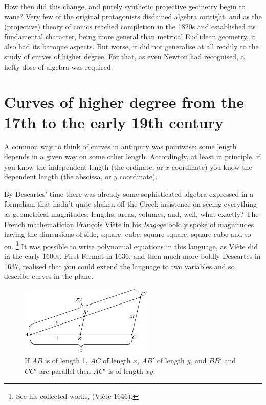 How then did this change, and purely synthetic projective geometry
begin to wane? Very few of the original protagonists disdained algebra
outright, and as the (projective) theory of conics reached completion in
the 1820s and established its fundamental character, being more general
than metrical Euclidean geometry, it also had its baroque aspects. But
worse, it did not generalise at all readily  to the study of curves of
higher degree. For that, as even Newton had recognised, a hefty dose of
algebra was required.







\section{Curves of higher degree from the 17th to the early 19th century}
A common way to think of curves in antiquity was pointwise: some length
depends in a given way on some other length. Accordingly, at least in
principle, if you know the independent length
(the ordinate, or $x$ coordinate) you know the dependent length (the
abscissa, or $y$ coordinate).

By Descartes' time there was already some sophisticated algebra expressed
in a formalism that hadn't quite shaken off   the Greek insistence on
seeing everything as geometrical magnitudes: lengths, areas, volumes, and,
well, what exactly? The French mathematician Fran\c{c}ois Vi\`ete in his
\emph{Isagoge} boldly spoke of magnitudes having the dimensions of side,
square, cube, square-square, square-cube and so on.%
%
\footnote{See his collected works, (Vi\`ete 1646).} 
%
It was possible to write polynomial
equations in this language, as Vi\`ete did in the early 1600s. First
Fermat in 1636, and then much more boldly Descartes in 1637, realised
that you could extend the language to two variables and so describe
curves in the plane.


\begin{figure}
  \includegraphics[width=180pt]{main/Multiplication}
\caption{If $AB$ is of length 1, $AC$ of length $x$, $AB'$ of
length $y$, and $BB'$ and $CC'$ are parallel then $AC'$ is of length $xy$.
}
      \label{figmultiplication}
\end{figure}

